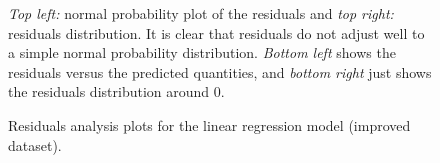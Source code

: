 \documentclass[letterpaper,10pt,english]{sphinxmanual}
\begin{document}
\begin{figure}[htbp]
\centering
\capstart

\caption{Residuals analysis plots for the linear regression model (improved dataset).}{\small 
\emph{Top left:} normal probability plot of the residuals and \emph{top right:} residuals
distribution. It is clear that residuals do not adjust well to a simple normal
probability distribution. \emph{Bottom left} shows the residuals versus the
predicted quantities, and \emph{bottom right} just shows the residuals distribution
around 0.
}\label{section2:figure36}\end{figure}
\end{document}
